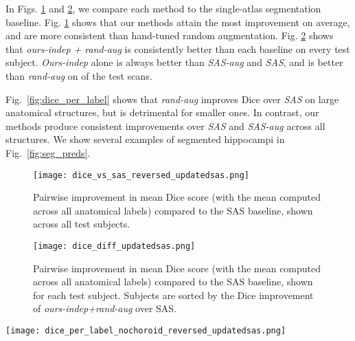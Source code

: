 \documentclass[10pt,twocolumn,letterpaper]{article}
\begin{document}
In Figs. \ref{fig:dice_vs_sas} and \ref{fig:dice_diff}, we compare each method to the single-atlas segmentation baseline. Fig. \ref{fig:dice_vs_sas} shows that our methods attain the most improvement on average, and are more consistent than hand-tuned random augmentation. Fig. \ref{fig:dice_diff} shows that \textit{ours-indep + rand-aug} is consistently better than each baseline on every test subject. \textit{Ours-indep} alone is always better than \textit{SAS-aug} and \textit{SAS}, and is better than \textit{rand-aug} on  of the  test scans. 

Fig.~\ref{fig:dice_per_label} shows that \textit{rand-aug} improves Dice over \textit{SAS} on large anatomical structures, but is detrimental for smaller ones. In contrast, our methods produce consistent improvements over \textit{SAS} and \textit{SAS-aug} across all structures. We show several examples of segmented hippocampi in Fig.~\ref{fig:seg_preds}.


\begin{figure}[t]
\texttt{[image: dice\_vs\_sas\_reversed\_updatedsas.png]}
        \vspace{-8pt}
    \caption{Pairwise improvement in mean Dice score (with the mean computed across all  anatomical labels) compared to the SAS baseline, shown across all test subjects. }\label{fig:dice_vs_sas}
\end{figure}

\begin{figure}[t]
    \centering
    \texttt{[image: dice\_diff\_updatedsas.png]}
    \vspace{-14pt}
    \caption{Pairwise improvement in mean Dice score (with the mean computed across all  anatomical labels) compared to the SAS baseline, shown for each test subject. Subjects are sorted by the Dice improvement of \textit{ours-indep+rand-aug} over SAS.}\label{fig:dice_diff}
\end{figure}
\begin{figure*}[t]
    \centering
    \texttt{[image: dice\_per\_label\_nochoroid\_reversed\_updatedsas.png]}
        \vspace{-12pt}
    \caption{Segmentation accuracy of each method across various brain structures. Labels are sorted by the volume occupied by each structure in the atlas (shown in parentheses), and labels consisting of left and right structures (\textit{e.g.}, Hippocampus) are combined. We abbreviate the labels: white matter (WM), cortex (CX), ventricle (vent), and cerebrospinal fluid (CSF). }\label{fig:dice_per_label}
\end{figure*}
\end{document}
